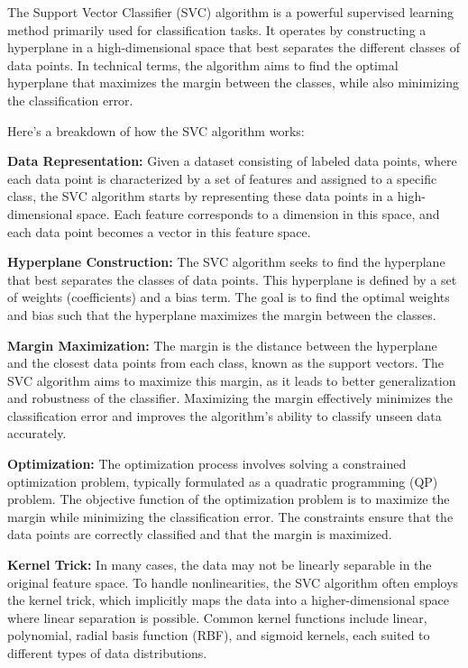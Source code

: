 \documentclass[preprint,aps,nofootinbib,a4paper,superscriptaddress,longbibliography,amsfonts,amssymb,amsmath,titlepage]{revtex4-2}
\begin{document}
The Support Vector Classifier (SVC) algorithm is a powerful supervised learning method primarily used for classification tasks. It operates by constructing a hyperplane in a high-dimensional space that best separates the different classes of data points. In technical terms, the algorithm aims to find the optimal hyperplane that maximizes the margin between the classes, while also minimizing the classification error.

Here's a breakdown of how the SVC algorithm works:

\textbf{Data Representation:} Given a dataset consisting of labeled data points, where each data point is characterized by a set of features and assigned to a specific class, the SVC algorithm starts by representing these data points in a high-dimensional space. Each feature corresponds to a dimension in this space, and each data point becomes a vector in this feature space.

\textbf{Hyperplane Construction:} The SVC algorithm seeks to find the hyperplane that best separates the classes of data points. This hyperplane is defined by a set of weights (coefficients) and a bias term. The goal is to find the optimal weights and bias such that the hyperplane maximizes the margin between the classes.

\textbf{Margin Maximization:} The margin is the distance between the hyperplane and the closest data points from each class, known as the support vectors. The SVC algorithm aims to maximize this margin, as it leads to better generalization and robustness of the classifier. Maximizing the margin effectively minimizes the classification error and improves the algorithm's ability to classify unseen data accurately.

\textbf{Optimization:} The optimization process involves solving a constrained optimization problem, typically formulated as a quadratic programming (QP) problem. The objective function of the optimization problem is to maximize the margin while minimizing the classification error. The constraints ensure that the data points are correctly classified and that the margin is maximized.

\textbf{Kernel Trick:} In many cases, the data may not be linearly separable in the original feature space. To handle nonlinearities, the SVC algorithm often employs the kernel trick, which implicitly maps the data into a higher-dimensional space where linear separation is possible. Common kernel functions include linear, polynomial, radial basis function (RBF), and sigmoid kernels, each suited to different types of data distributions.
\end{document}

